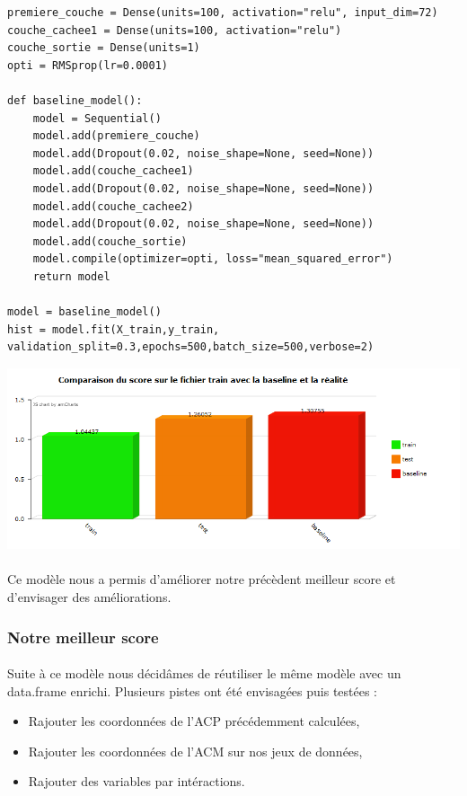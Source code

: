 \documentclass[14pt, openany]{article}
\begin{document}
\begin{verbatim}
premiere_couche = Dense(units=100, activation="relu", input_dim=72)
couche_cachee1 = Dense(units=100, activation="relu")
couche_sortie = Dense(units=1)
opti = RMSprop(lr=0.0001)

def baseline_model():
    model = Sequential()
    model.add(premiere_couche)
    model.add(Dropout(0.02, noise_shape=None, seed=None))
    model.add(couche_cachee1)
    model.add(Dropout(0.02, noise_shape=None, seed=None))
    model.add(couche_cachee2)
    model.add(Dropout(0.02, noise_shape=None, seed=None))
    model.add(couche_sortie)
    model.compile(optimizer=opti, loss="mean_squared_error")
    return model
    
model = baseline_model()
hist = model.fit(X_train,y_train,
validation_split=0.3,epochs=500,batch_size=500,verbose=2)
\end{verbatim}

\begin{center}
\includegraphics[scale=0.7]{Images/deep1keras.png}
\end{center}

\paragraph{}
Ce modèle nous a permis d'améliorer notre précèdent meilleur score et d'envisager des améliorations.

\subsubsection{Notre meilleur score}
\paragraph{}
Suite à ce modèle nous décidâmes de réutiliser le même modèle avec un data.frame enrichi. Plusieurs pistes ont été envisagées puis testées :
\begin{itemize}
    \item Rajouter les coordonnées de l'ACP précédemment calculées,
    \item Rajouter les coordonnées de l'ACM sur nos jeux de données,
    \item Rajouter des variables par intéractions.
\end{itemize}
\end{document}
